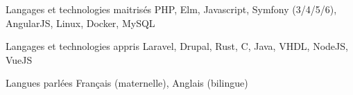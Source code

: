 

\begin{cvskills}

	\cvskill
	{Langages et technologies maitrisés} %
	{PHP, Elm, Javascript, Symfony (3/4/5/6), AngularJS, Linux, Docker, MySQL} %

	\cvskill
	{Langages et technologies appris} %
	{Laravel, Drupal, Rust, C, Java, VHDL, NodeJS, VueJS} %

	\cvskill
	{Langues parlées} %
	{Français (maternelle), Anglais (bilingue)} %


\end{cvskills}
